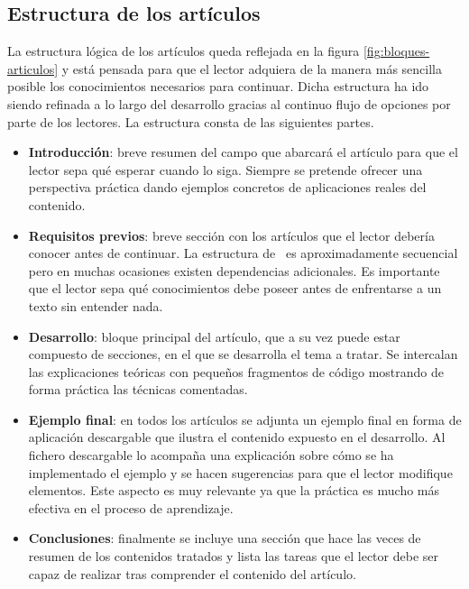 \subsection{Estructura de los artículos}

La estructura lógica de los artículos queda reflejada en la figura \ref{fig:bloques-articulos}
y está pensada para que el lector adquiera de la manera más sencilla posible
los conocimientos necesarios para continuar. Dicha estructura ha ido siendo
refinada a lo largo del desarrollo gracias al continuo flujo de opciones
por parte de los lectores. La estructura consta de las siguientes partes.\\

\begin{itemize}
    \itemsep0em
    \item \textbf{Introducción}: breve resumen del campo que abarcará
    el artículo para que el lector sepa qué esperar cuando lo siga. Siempre
    se pretende ofrecer una perspectiva práctica dando ejemplos concretos
    de aplicaciones reales del contenido.
    \item \textbf{Requisitos previos}: breve sección con los artículos
    que el lector debería conocer antes de continuar. La estructura de 
    \wiki\ es aproximadamente secuencial pero en muchas ocasiones existen
    dependencias adicionales. Es importante que el lector sepa qué conocimientos
    debe poseer antes de enfrentarse a un texto sin entender nada.
    \item \textbf{Desarrollo}: bloque principal del artículo, que a su vez
    puede estar compuesto de secciones, en el que se desarrolla el tema a tratar.
    Se intercalan las explicaciones teóricas con pequeños fragmentos de
    código mostrando de forma práctica las técnicas comentadas. 
    \item \textbf{Ejemplo final}: en todos los artículos se adjunta un ejemplo
    final en forma de aplicación descargable que ilustra el contenido
    expuesto en el desarrollo. Al fichero descargable lo acompaña una explicación
    sobre cómo se ha implementado el ejemplo y se hacen sugerencias para
    que el lector modifique elementos. Este aspecto es muy relevante ya que
    la práctica es mucho más efectiva en el proceso de aprendizaje.
    \item \textbf{Conclusiones}: finalmente se incluye una sección que hace
    las veces de resumen de los contenidos tratados y lista las tareas
    que el lector debe ser capaz de realizar tras comprender el contenido
    del artículo.
\end{itemize}

